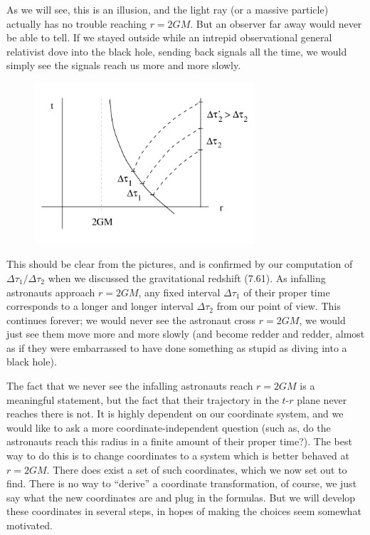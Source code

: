 \documentclass[12pt]{article}
\begin{document}
As we will see, this is an illusion, and the light ray (or a massive
particle) actually has no trouble reaching $r=2GM$.  But an observer
far away would never be able to tell.  If we stayed outside while
an intrepid observational general relativist dove into the black
hole, sending back signals all the time, we would simply see the
signals reach us more and more slowly.
\begin{figure}
  \centerline{
  \includegraphics[height=6cm]{pdf/seven10}}
\end{figure}
This should be clear from the pictures, and is confirmed
by our computation of $\Delta\tau_1/\Delta\tau_2$ when we discussed
the gravitational redshift (7.61).  As infalling astronauts
approach $r=2GM$, any fixed interval $\Delta\tau_1$ of their proper
time corresponds to a longer and longer interval $\Delta\tau_2$
from our point of view.  This continues forever; we would never see
the astronaut cross $r=2GM$, we would just see them move more and 
more slowly (and become redder and redder, almost as if they were
embarrassed to have done something as stupid as diving into a black
hole).

The fact that we never see the infalling astronauts reach $r=2GM$
is a meaningful statement, but the fact that their trajectory in
the $t$-$r$ plane never reaches there is not.  It is highly dependent
on our coordinate system, and we would like to ask a more 
coordinate-independent question (such as, do the astronauts reach
this radius in a finite amount of their proper time?).  The best
way to do this is to change coordinates to a system which is better
behaved at $r=2GM$.
There does exist a set of such coordinates, which we now set out to
find.  There is no way to ``derive'' a coordinate transformation, of
course, we just say what the new coordinates are and plug in the
formulas.  But we will develop these coordinates in several steps,
in hopes of making the choices seem somewhat motivated.
\end{document}
